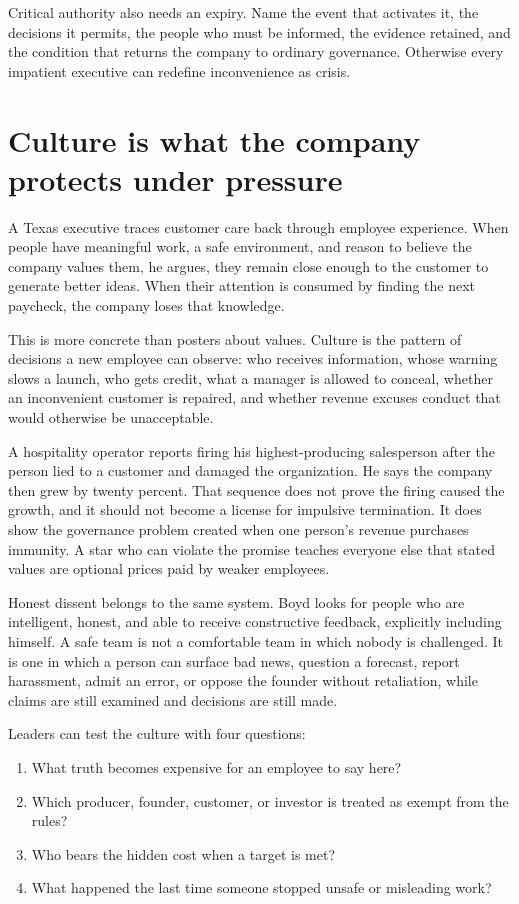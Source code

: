Critical authority also needs an expiry. Name the event that activates it, the
decisions it permits, the people who must be informed, the evidence retained,
and the condition that returns the company to ordinary governance. Otherwise
every impatient executive can redefine inconvenience as crisis.

\section{Culture is what the company protects under pressure}

A Texas executive traces customer care back through employee experience. When
people have meaningful work, a safe environment, and reason to believe the
company values them, he argues, they remain close enough to the customer to
generate better ideas. When their attention is consumed by finding the next
paycheck, the company loses that knowledge.

This is more concrete than posters about values. Culture is the pattern of
decisions a new employee can observe: who receives information, whose warning
slows a launch, who gets credit, what a manager is allowed to conceal, whether
an inconvenient customer is repaired, and whether revenue excuses conduct
that would otherwise be unacceptable.

A hospitality operator reports firing his highest-producing salesperson after
the person lied to a customer and damaged the organization. He says the company
then grew by twenty percent. That sequence does not prove the firing caused
the growth, and it should not become a license for impulsive termination. It
does show the governance problem created when one person's revenue purchases
immunity. A star who can violate the promise teaches everyone else that stated
values are optional prices paid by weaker employees.

Honest dissent belongs to the same system. Boyd looks for people who are
intelligent, honest, and able to receive constructive feedback, explicitly
including himself. A safe team is not a comfortable team in which nobody is
challenged. It is one in which a person can surface bad news, question a
forecast, report harassment, admit an error, or oppose the founder without
retaliation, while claims are still examined and decisions are still made.

Leaders can test the culture with four questions:

\begin{enumerate}[itemsep=0.14em]
\item What truth becomes expensive for an employee to say here?
\item Which producer, founder, customer, or investor is treated as exempt from
  the rules?
\item Who bears the hidden cost when a target is met?
\item What happened the last time someone stopped unsafe or misleading work?
\end{enumerate}

